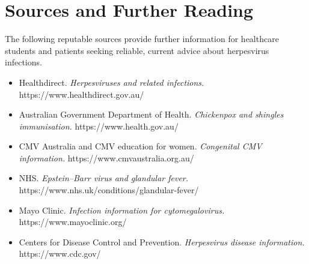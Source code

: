 \section*{Sources and Further Reading}
The following reputable sources provide further information for healthcare students and patients seeking reliable, current advice about herpesvirus infections.

\begin{itemize}
    \item Healthdirect. \textit{Herpesviruses and related infections.} https://www.healthdirect.gov.au/
    \item Australian Government Department of Health. \textit{Chickenpox and shingles immunisation.} https://www.health.gov.au/
    \item CMV Australia and CMV education for women. \textit{Congenital CMV information.} https://www.cmvaustralia.org.au/
    \item NHS. \textit{Epstein--Barr virus and glandular fever.} https://www.nhs.uk/conditions/glandular-fever/
    \item Mayo Clinic. \textit{Infection information for cytomegalovirus.} https://www.mayoclinic.org/
    \item Centers for Disease Control and Prevention. \textit{Herpesvirus disease information.} https://www.cdc.gov/
\end{itemize}
